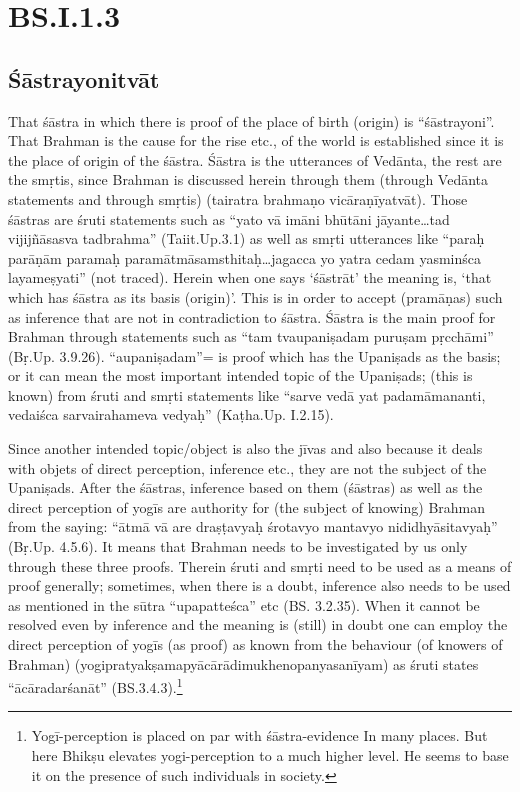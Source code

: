 \section*{BS.I.1.3}

\subsection*{Śāstrayonitvāt}

That śāstra in which there is proof of the place of birth (origin) is “śāstrayoni”. That Brahman is the cause for the rise etc., of the world is established since it is the place of origin of the śāstra. Śāstra is the utterances of Vedānta, the rest are the smṛtis, since Brahman is discussed herein through them (through Vedānta statements and through smṛtis) (tairatra brahmaṇo vicāraṇīyatvāt). Those śāstras are śruti statements such as “yato vā imāni bhūtāni jāyante…tad vijijñāsasva tadbrahma” (Taiit.Up.3.1) as well as smṛti utterances like “paraḥ parāṇām paramaḥ paramātmāsamsthitaḥ…jagacca yo yatra cedam yasminśca layameṣyati” (not traced). Herein when one says ‘śāstrāt’ the meaning is, ‘that which has śāstra as its basis (origin)’. This is in order to accept (pramāṇas) such as inference that are not in contradiction to śāstra. Śāstra is the main proof for Brahman through statements such as “tam tvaupaniṣadam puruṣam pṛcchāmi” (Bṛ.Up. 3.9.26). “aupaniṣadam”= is proof which has the Upaniṣads as the basis; or it can mean the most important intended topic of the Upaniṣads; (this is known) from śruti and smṛti statements like “sarve vedā yat padamāmananti, vedaiśca sarvairahameva vedyaḥ” (Kaṭha.Up. I.2.15).

Since another intended topic/object is also the jīvas and also because it deals with objets of direct perception, inference etc., they are not the subject  of the Upaniṣads. After the śāstras, inference based on them (śāstras) as well as the direct perception of yogīs are authority for (the subject of knowing) Brahman from the saying: “ātmā vā are draṣṭavyaḥ śrotavyo mantavyo nididhyāsitavyaḥ” (Bṛ.Up. 4.5.6). It means that Brahman needs to be investigated by us only through these three proofs. Therein śruti and smṛti need to be used as a means of proof generally; sometimes, when there is a doubt, inference also needs to be used as mentioned in the sūtra “upapatteśca” etc (BS. 3.2.35). When it cannot be resolved even by inference and the meaning is (still) in doubt one can employ the direct perception of yogīs (as proof) as known from the behaviour (of knowers of Brahman) (yogipratyakṣamapyācārādimukhenopanyasanīyam) as śruti states “ācāradarśanāt” (BS.3.4.3).\footnote{Yogī-perception is placed on par with śāstra-evidence In many places. But here Bhikṣu elevates yogi-perception to a much higher level. He seems to base it on the presence of such individuals in society.} 

